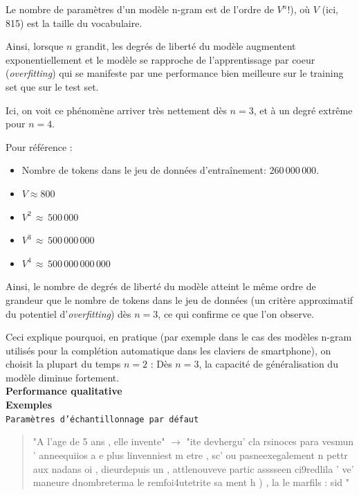 Le \og nombre de paramètres \fg{} d'un modèle n-gram est de l'ordre de
$V^n!$), où $V$ (ici, 815) est la taille du vocabulaire.

Ainsi, lorsque $n$ grandit, les degrés de liberté du modèle augmentent
exponentiellement et le modèle se rapproche de l'apprentissage par coeur
(\emph{overfitting}) qui se manifeste par une performance bien meilleure
sur le training set que sur le test set.

Ici, on voit ce phénomène arriver très nettement dès \(n=3\), et à un
degré extrême pour \(n=4\).

Pour référence :

\begin{itemize}
\item
  Nombre de tokens dans le jeu de données d'entraînement:
  $260\,000\,000$.
\item
  $V \approx 800$
\item
  $V^2\,\approx\,500\,000$
\item
  $V^3\,\approx\,500\,000\,000$
\item
  $V^4\,\approx\,500\,000\,000\,000$
\end{itemize}

Ainsi, le nombre de degrés de liberté du modèle atteint le même ordre
de grandeur que le nombre de tokens dans le jeu de données (un critère 
approximatif du potentiel d'\emph{overfitting}) dès \(n=3\), ce qui 
confirme ce que l'on observe.

Ceci explique pourquoi, en pratique (par exemple dans le cas des modèles
n-gram utilisés pour la complétion automatique dans les claviers de
smartphone), on choisit la plupart du temps \(n=2\) : Dès \(n=3\), la
capacité de généralisation du modèle diminue fortement. \\


\noindent{}\textbf{Performance qualitative} \\

\textbf{Exemples} \\


\noindent{} \texttt{Paramètres d'échantillonnage par défaut}

  \begin{quotation}
  "A l'age de 5 ans , elle invente" $\rightarrow$ "ite devhergu' cla rsinoces para vesmun ' anneequiios a e plus linvenniest m etre  , sc' ou pasneexegalement n pettr aux nadans oi , dieurdepuis un  , attlenouveve partic asssseen ci9redlila ' ve' maneure dnombreterma le remfoi4utetrite sa ment h ) , la le marfils : sid "
  \end{quotation}


